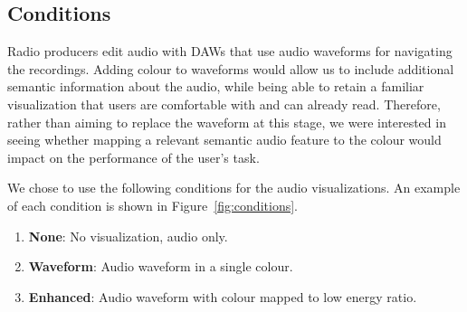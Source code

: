 \subsection{Conditions}
Radio producers edit audio with DAWs that use audio waveforms for navigating the recordings.  Adding colour to
waveforms would allow us to include additional semantic information about the audio, while being able to retain a
familiar visualization that users are comfortable with and can already read.  Therefore, rather than aiming to replace
the waveform at this stage, we were interested in seeing whether mapping a relevant semantic audio feature to the
colour would impact on the performance of the user's task.

We chose to use the following conditions for the audio visualizations. An example of each condition is shown in
Figure~\ref{fig:conditions}.

\begin{enumerate}[label=C\arabic*.]
  \item \textbf{None}: No visualization, audio only.
  \item \textbf{Waveform}: Audio waveform in a single colour.
  \item \textbf{Enhanced}: Audio waveform with colour mapped to low energy ratio.
\end{enumerate}


